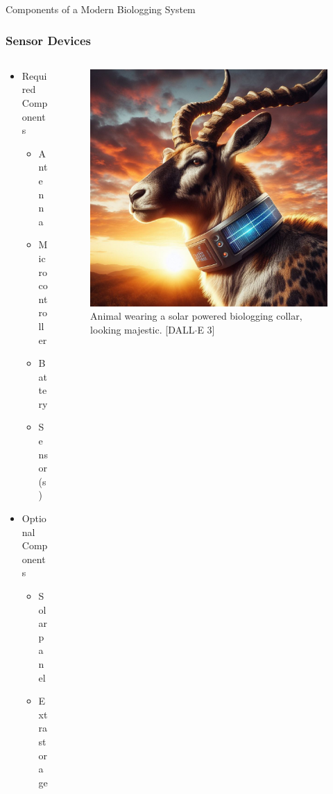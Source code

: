\documentclass{beamer}
\begin{document}
  \begin{frame}{Components of a Modern Biologging System}
    \frametitle{Sensor Devices}
    \begin{columns}
      \begin{column}{.5\textwidth}
        \begin{itemize}
          \item Required Components
          \begin{itemize}
            \item Antenna
            \item Microcontroller
            \item Battery
            \item Sensor(s)
          \end{itemize}
          \item Optional Components
          \begin{itemize}
            \item Solar panel
            \item Extra storage
          \end{itemize}
        \end{itemize}
      \end{column}
      \begin{column}{0.5\textwidth}
        \begin{figure}[htbp]
          \centering
          \includegraphics[height=.6\textheight]{Solar_collar.jpg}
          \caption{Animal wearing a solar powered biologging collar, looking majestic. [DALL$\cdot$E 3]}
          \label{fig:Solar_collar}
        \end{figure}
    \end{column}
    \end{columns}
  \end{frame}
\end{document}
